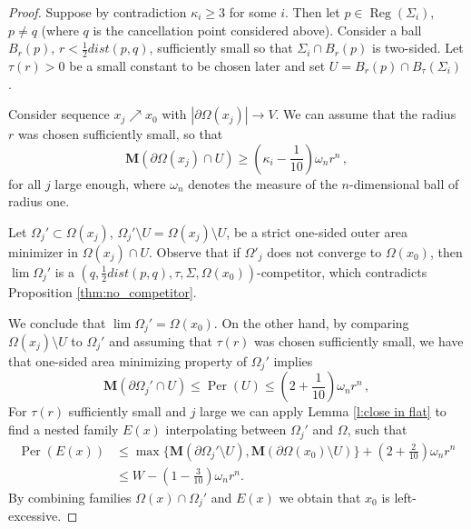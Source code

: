 \documentclass[12pt,twoside]{amsart}
\numberwithin{equation}{section}
\renewcommand{\leq}{\leqslant}
\renewcommand{\geq}{\geqslant}
\newcommand{\bM}{\mathbf{M}}
\DeclareMathOperator{\Per}{Per}
\newcommand{\eps}{\varepsilon}
\DeclareMathOperator{\reg}{Reg}
\begin{document}
\begin{proof}  Suppose by contradiction $\kappa_i\geq 3$ for some $i$. Then let $p\in \reg(\Sigma_i)$, $p\neq q$ (where $q$ is the cancellation point considered above). Consider a ball  $B_r(p)$, $r < \frac{1}{2}dist(p,q)$, sufficiently small so that $\Sigma_i\cap B_r(p)$ is two-sided. Let $\tau(r)>0$ be a small constant
to be chosen later
and set $U = B_r(p) \cap B_\tau(\Sigma_i)$.

Consider sequence $x_j \nearrow x_0$
with $|\partial \Omega(x_j)| \rightarrow V$.
We can assume that the radius $r$ was
 chosen sufficiently small, so that
\begin{equation}\label{e:mult_bound1}
    \bM(\partial \Omega(x_j) \cap U)\geq \left(\kappa_i - \frac{1}{10}\right) \omega_n  r^n\,,
\end{equation}
for all $j$ large enough, where $\omega_n$ denotes the measure of the $n$-dimensional ball of radius one.

Let $\Omega_j' \subset \Omega(x_j)$, $\Omega_j' \setminus U = \Omega(x_j)
\setminus U$, be a strict one-sided outer area minimizer
in $\Omega(x_j)\cap U$.
Observe that if $\Omega'_j$ does not converge to $\Omega(x_0)$,
then $\lim \Omega_j'$ is a $(q,\frac{1}{2}dist(p,q), \tau, \Sigma, \Omega(x_0))$-competitor,
which contradicts Proposition \ref{thm:no_competitor}.

We conclude that $\lim \Omega_j' = \Omega(x_0)$.
On the other hand, 
by comparing $\Omega(x_j) \setminus U$ to $\Omega_j'$ and
assuming that $\tau(r)$
was chosen sufficiently small, we have that one-sided 
area minimizing property of $\Omega_j'$ implies 
\begin{equation*}
    \bM(\partial \Omega_j' \cap U)\leq \Per(U) \leq \left(2 + \frac{1}{10}\right) \omega_n  r^n\,,
\end{equation*}
For $\tau(r)$
 sufficiently small and $j$ large we can apply
Lemma \ref{l:close in flat} to find a nested family $E(x)$
interpolating between $\Omega_j'$ and $\Omega$, such that
\begin{align*}\Per( E(x) ) &\leq \max \{\bM(\partial \Omega_j' \setminus U),
\bM(\partial \Omega(x_0) \setminus U) \} + \left(2 + \frac{2}{10}\right) \omega_n  r^n\\
& \leq W - \left( 1-\frac{3}{10} \right) \omega_n r^n.
\end{align*}
By combining families $\Omega(x) \cap \Omega_j'$
and $E(x)$ we obtain that $x_0$ is left-excessive.
\end{proof}
	
\end{document}
